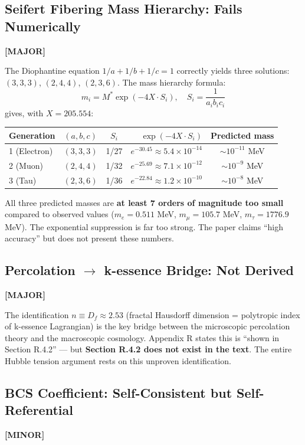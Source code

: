 \documentclass[12pt, a4paper]{article}
\newcommand{\major}{\textcolor{major}{\textbf{[MAJOR]}}}
\newcommand{\minor}{\textcolor{minor}{\textbf{[MINOR]}}}
\begin{document}
\subsection{Seifert Fibering Mass Hierarchy: Fails Numerically}
\major{}

The Diophantine equation $1/a + 1/b + 1/c = 1$ correctly yields three solutions: $(3,3,3)$, $(2,4,4)$, $(2,3,6)$. The mass hierarchy formula:
\begin{equation}
    m_i = M^* \exp\left(-4X \cdot S_i\right), \quad S_i = \frac{1}{a_i b_i c_i}
\end{equation}
gives, with $X = 205.554$:
\begin{center}
\begin{tabular}{lccrc}
\toprule
Generation & $(a,b,c)$ & $S_i$ & $\exp(-4X \cdot S_i)$ & Predicted mass \\
\midrule
1 (Electron) & $(3,3,3)$ & 1/27 & $e^{-30.45} \approx 5.4 \times 10^{-14}$ & $\sim 10^{-11}$ MeV \\
2 (Muon) & $(2,4,4)$ & 1/32 & $e^{-25.69} \approx 7.1 \times 10^{-12}$ & $\sim 10^{-9}$ MeV \\
3 (Tau) & $(2,3,6)$ & 1/36 & $e^{-22.84} \approx 1.2 \times 10^{-10}$ & $\sim 10^{-8}$ MeV \\
\bottomrule
\end{tabular}
\end{center}
All three predicted masses are \textbf{at least 7 orders of magnitude too small} compared to observed values ($m_e = 0.511$ MeV, $m_\mu = 105.7$ MeV, $m_\tau = 1776.9$ MeV). The exponential suppression is far too strong. The paper claims ``high accuracy'' but does not present these numbers.

\subsection{Percolation $\to$ k-essence Bridge: Not Derived}
\major{}

The identification $n \equiv D_f \approx 2.53$ (fractal Hausdorff dimension = polytropic index of k-essence Lagrangian) is the key bridge between the microscopic percolation theory and the macroscopic cosmology. Appendix R states this is ``shown in Section R.4.2'' --- but \textbf{Section R.4.2 does not exist in the text}. The entire Hubble tension argument rests on this unproven identification.

\subsection{BCS Coefficient: Self-Consistent but Self-Referential}
\minor{}
\end{document}
